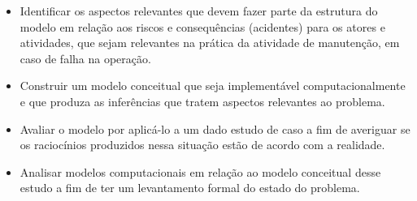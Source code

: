 \begin{itemize}
    \item Identificar os aspectos relevantes que devem fazer parte da estrutura do modelo em relação aos riscos e consequências (acidentes) para os atores e atividades, que sejam relevantes na prática da atividade de manutenção, em caso de falha na operação. 
    \item Construir um modelo conceitual que seja implementável computacionalmente e que produza as inferências que tratem aspectos relevantes ao problema.
    \item Avaliar o modelo por aplicá-lo a um dado estudo de caso a fim de averiguar se os raciocínios produzidos nessa situação estão de acordo com a realidade.  
    \item Analisar modelos computacionais em relação ao modelo conceitual desse estudo a fim de ter um levantamento formal do estado do problema.
\end{itemize}